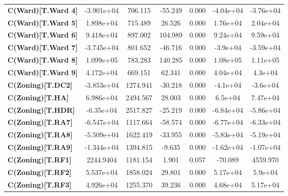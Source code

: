 \documentclass{report}
\begin{document}
\begin{center}
\begin{tabular}{lcccccc}
\textbf{C(Ward)[T.Ward 4]}  &   -3.901e+04  &      706.115     &   -55.249  &         0.000        &    -4.04e+04    &    -3.76e+04     \\
\textbf{C(Ward)[T.Ward 5]}  &    1.898e+04  &      715.489     &    26.526  &         0.000        &     1.76e+04    &     2.04e+04     \\
\textbf{C(Ward)[T.Ward 6]}  &    9.418e+04  &      897.002     &   104.989  &         0.000        &     9.24e+04    &     9.59e+04     \\
\textbf{C(Ward)[T.Ward 7]}  &   -3.745e+04  &      801.652     &   -46.716  &         0.000        &     -3.9e+04    &    -3.59e+04     \\
\textbf{C(Ward)[T.Ward 8]}  &    1.099e+05  &      783.283     &   140.285  &         0.000        &     1.08e+05    &     1.11e+05     \\
\textbf{C(Ward)[T.Ward 9]}  &    4.172e+04  &      669.151     &    62.341  &         0.000        &     4.04e+04    &      4.3e+04     \\
\textbf{C(Zoning)[T.DC2]}   &   -3.853e+04  &     1274.941     &   -30.218  &         0.000        &     -4.1e+04    &     -3.6e+04     \\
\textbf{C(Zoning)[T.HA]}    &    6.986e+04  &     2494.567     &    28.003  &         0.000        &      6.5e+04    &     7.47e+04     \\
\textbf{C(Zoning)[T.HDR]}   &    -6.35e+04  &     2517.827     &   -25.219  &         0.000        &    -6.84e+04    &    -5.86e+04     \\
\textbf{C(Zoning)[T.RA7]}   &   -6.547e+04  &     1117.664     &   -58.574  &         0.000        &    -6.77e+04    &    -6.33e+04     \\
\textbf{C(Zoning)[T.RA8]}   &   -5.509e+04  &     1622.419     &   -33.955  &         0.000        &    -5.83e+04    &    -5.19e+04     \\
\textbf{C(Zoning)[T.RA9]}   &   -1.344e+04  &     1394.815     &    -9.635  &         0.000        &    -1.62e+04    &    -1.07e+04     \\
\textbf{C(Zoning)[T.RF1]}   &    2244.9404  &     1181.154     &     1.901  &         0.057        &      -70.089    &     4559.970     \\
\textbf{C(Zoning)[T.RF2]}   &    5.537e+04  &     1858.024     &    29.801  &         0.000        &     5.17e+04    &      5.9e+04     \\
\textbf{C(Zoning)[T.RF3]}   &    4.926e+04  &     1255.370     &    39.236  &         0.000        &     4.68e+04    &     5.17e+04     \\

\end{tabular}
\end{center}
\end{document}
